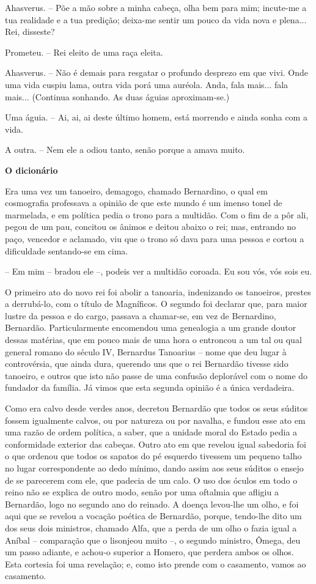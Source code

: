 Ahasverus. -- Põe a mão sobre a minha cabeça, olha bem para mim;
incute-me a tua realidade e a tua predição; deixa-me sentir um pouco da
vida nova e plena... Rei, disseste?

Prometeu. -- Rei eleito de uma raça eleita.

Ahasverus. -- Não é demais para resgatar o profundo desprezo em que
vivi. Onde uma vida cuspiu lama, outra vida porá uma auréola. Anda, fala
mais... fala mais... (Continua sonhando. As duas águias aproximam-se.)

Uma águia. -- Ai, ai, ai deste último homem, está morrendo e ainda sonha
com a vida.

A outra. -- Nem ele a odiou tanto, senão porque a amava muito.

\textbf{O dicionário}

Era uma vez um tanoeiro, demagogo, chamado Bernardino, o qual em
cosmografia professava a opinião de que este mundo é um imenso tonel de
marmelada, e em política pedia o trono para a multidão. Com o fim de a
pôr ali, pegou de um pau, concitou os ânimos e deitou abaixo o rei; mas,
entrando no paço, vencedor e aclamado, viu que o trono só dava para uma
pessoa e cortou a dificuldade sentando-se em cima.

-- Em mim -- bradou ele --, podeis ver a multidão coroada. Eu sou vós,
vós sois eu.

O primeiro ato do novo rei foi abolir a tanoaria, indenizando os
tanoeiros, prestes a derrubá-lo, com o título de Magníficos. O segundo
foi declarar que, para maior lustre da pessoa e do cargo, passava a
chamar-se, em vez de Bernardino, Bernardão. Particularmente encomendou
uma genealogia a um grande doutor dessas matérias, que em pouco mais de
uma hora o entroncou a um tal ou qual general romano do século IV,
Bernardus Tanoarius -- nome que deu lugar à controvérsia, que ainda
dura, querendo uns que o rei Bernardão tivesse sido tanoeiro, e outros
que isto não passe de uma confusão deplorável com o nome do fundador da
família. Já vimos que esta segunda opinião é a única verdadeira.

Como era calvo desde verdes anos, decretou Bernardão que todos os seus
súditos fossem igualmente calvos, ou por natureza ou por navalha, e
fundou esse ato em uma razão de ordem política, a saber, que a unidade
moral do Estado pedia a conformidade exterior das cabeças. Outro ato em
que revelou igual sabedoria foi o que ordenou que todos os sapatos do pé
esquerdo tivessem um pequeno talho no lugar correspondente ao dedo
mínimo, dando assim aos seus súditos o ensejo de se parecerem com ele,
que padecia de um calo. O uso dos óculos em todo o reino não se explica
de outro modo, senão por uma oftalmia que afligiu a Bernardão, logo no
segundo ano do reinado. A doença levou-lhe um olho, e foi aqui que se
revelou a vocação poética de Bernardão, porque, tendo-lhe dito um dos
seus dois ministros, chamado Alfa, que a perda de um olho o fazia igual
a Aníbal -- comparação que o lisonjeou muito --, o segundo ministro,
Ômega, deu um passo adiante, e achou-o superior a Homero, que perdera
ambos os olhos. Esta cortesia foi uma revelação; e, como isto prende com
o casamento, vamos ao casamento.


